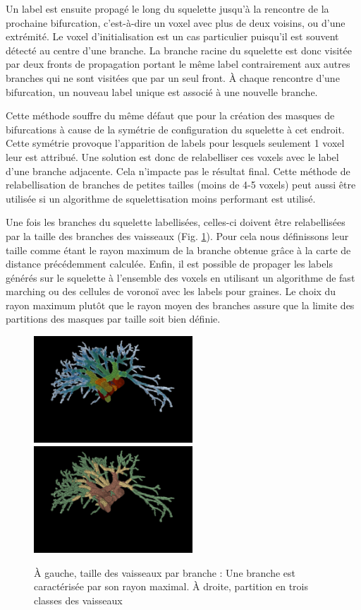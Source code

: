 Un label est ensuite propagé le long du squelette jusqu'à la rencontre de la prochaine bifurcation, c'est-à-dire un voxel avec plus de deux voisins, ou d'une extrémité. Le voxel d'initialisation est un cas particulier puisqu'il est souvent détecté au centre d'une branche. La branche racine du squelette est donc visitée par deux fronts de propagation portant le même label contrairement aux autres branches qui ne sont visitées que par un seul front. À chaque rencontre d'une bifurcation, un nouveau label unique est associé à une nouvelle branche.

Cette méthode souffre du même défaut que pour la création des masques de bifurcations à cause de la symétrie de configuration du squelette à cet endroit. Cette symétrie provoque l'apparition de labels pour lesquels seulement 1 voxel leur est attribué. Une solution est donc de relabelliser ces voxels avec le label d'une branche adjacente. Cela n'impacte pas le résultat final. Cette méthode de relabellisation de branches de petites tailles (moins de 4-5 voxels) peut aussi être utilisée si un algorithme de squelettisation moins performant est utilisé.

Une fois les branches du squelette labellisées, celles-ci doivent être relabellisées par la taille des branches des vaisseaux (Fig. \ref{fig:vessels_partition}). Pour cela nous définissons leur taille comme étant le rayon maximum de la branche obtenue grâce à la carte de distance précédemment calculée. Enfin, il est possible de propager les labels générés sur le squelette à l'ensemble des voxels en utilisant un algorithme de fast marching ou des cellules de voronoï avec les labels pour graines. Le choix du rayon maximum plutôt que le rayon moyen des branches assure que la limite des partitions des masques par taille soit bien définie.

\begin{figure}[!ht]
  \centering
  \includegraphics[height=4cm]{Images/vs_labels.png}
  \includegraphics[height=4cm]{Images/vs_labelMask.png}
  \caption{À gauche, taille des vaisseaux par branche : Une branche est caractérisée par son rayon maximal. À droite, partition en trois classes des vaisseaux }
  \label{fig:vessels_partition}
\end{figure}

